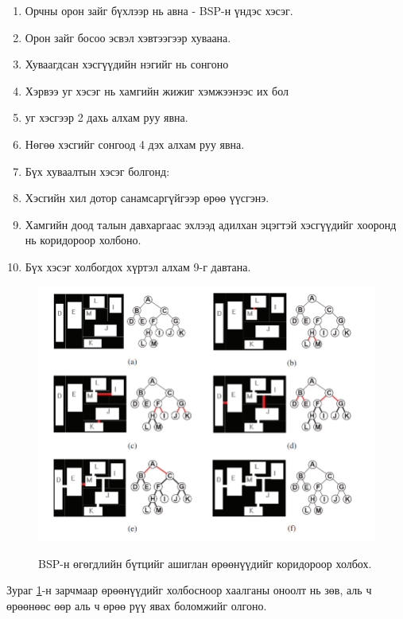 \begin{enumerate}
	\item Орчны орон зайг бүхлээр нь авна - BSP-н үндэс хэсэг.
	\item Орон зайг босоо эсвэл хэвтээгээр хуваана.
	\item Хуваагдсан хэсгүүдийн нэгийг нь сонгоно
	\item Хэрвээ уг хэсэг нь хамгийн жижиг хэмжээнээс их бол
	\item \quad уг хэсгээр 2 дахь алхам руу явна.
	\item Нөгөө хэсгийг сонгоод 4 дэх алхам руу явна.
	\item Бүх хуваалтын хэсэг болгонд:
	\item \quad Хэсгийн хил дотор санамсаргүйгээр өрөө үүсгэнэ.
	\item Хамгийн доод талын давхаргаас эхлээд адилхан эцэгтэй хэсгүүдийг хооронд нь коридороор  холбоно.
	\item Бүх хэсэг холбогдох хүртэл алхам 9-г давтана.
\end{enumerate}

\begin{figure}[H]
	\centering
	\caption{BSP-н өгөгдлийн бүтцийг ашиглан өрөөнүүдийг коридороор  холбох.}
	\includegraphics[width=\textwidth]{./images/BSP_connecting.png}
	\label{fig:BSP_connecting}
\end{figure}
Зураг \ref{fig:BSP_connecting}-н зарчмаар өрөөнүүдийг холбосноор хаалганы оноолт нь зөв, аль ч өрөөнөөс өөр аль ч өрөө рүү явах боломжийг олгоно\cite{PCGinGames2016}.

